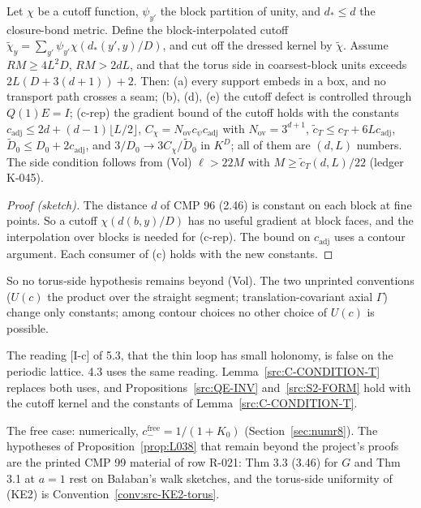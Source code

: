 \begin{lemma}[Lemma T (L-284)]\label{src:C-CONDITION-T}
Let $\chi$ be a cutoff function, $\psi_{y'}$ the block partition of unity, and $d_*\le d$ the closure-bond metric. Define the block-interpolated cutoff $\tilde\chi_y=\sum_{y'}\psi_{y'}\chi(d_*(y',y)/D)$, and cut off the dressed kernel by $\tilde\chi$. Assume $RM\ge4L^2D$, $RM>2dL$, and that the torus side in coarsest-block units exceeds $2L(D+3(d+1))+2$. Then:
(a) every support embeds in a box, and no transport path crosses a seam;
(b), (d), (e) the cutoff defect is controlled through $Q(1)E=I$;
(c-rep) the gradient bound of the cutoff holds with the constants $c_{\mathrm{adj}}\le2d+(d-1)\lfloor L/2\rfloor$, $C_\chi=N_{\mathrm{ov}}c_\psi c_{\mathrm{adj}}$ with $N_{\mathrm{ov}}=3^{d+1}$, $\tilde c_T\le c_T+6Lc_{\mathrm{adj}}$, $\tilde D_0\le D_0+2c_{\mathrm{adj}}$, and $3/D_0\to3C_\chi/\tilde D_0$ in $K^D$; all of them are $(d,L)$ numbers.
The side condition follows from (Vol) $\ell>22M$ with $M\ge\tilde c_T(d,L)/22$ (ledger K-045).
\end{lemma}
\begin{proof}[Proof (sketch)]
The distance $d$ of CMP 96 (2.46) is constant on each block at fine points. So a cutoff $\chi(d(b,y)/D)$ has no useful gradient at block faces, and the interpolation over blocks is needed for (c-rep). The bound on $c_{\mathrm{adj}}$ uses a contour argument. Each consumer of (c) holds with the new constants.
\end{proof}
So no torus-side hypothesis remains beyond (Vol). The two unprinted conventions ($U(c)$ the product over the straight segment; translation-covariant axial $\Gamma$) change only constants; among contour choices no other choice of $U(c)$ is possible.

\begin{remark}
The reading [I-c] of  5.3, that the thin loop has small holonomy, is false on the periodic lattice.  4.3 uses the same reading. Lemma~\ref{src:C-CONDITION-T} replaces both uses, and Propositions~\ref{src:QE-INV} and~\ref{src:S2-FORM} hold with the cutoff kernel and the constants of Lemma~\ref{src:C-CONDITION-T}.
\end{remark}

The free case: numerically, $c_-^{\mathrm{free}}=1/(1+K_0)$ (Section~\ref{sec:numr8}). The hypotheses of Proposition~\ref{prop:L038} that remain beyond the project's proofs are the printed CMP 99 material of row R-021: Thm 3.3 (3.46) for $G$ and Thm 3.1 at $a=1$ rest on Ba{\l}aban's walk sketches, and the torus-side uniformity of (KE2) is Convention~\ref{conv:src-KE2-torus}.


